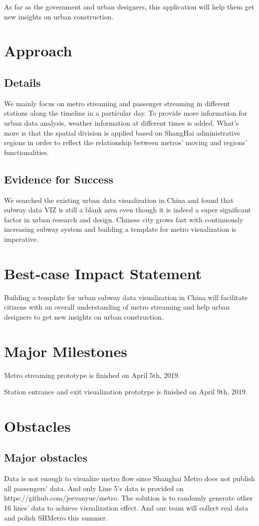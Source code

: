 \documentclass{proc}
\begin{document}
As far as the government and urban designers, this application will help them get new insights on urban construction.


\section{Approach}
\subsection{Details}
We mainly focus on metro streaming and passenger streaming in different stations along the timeline in a particular day. To provide more information for urban data analysis, weather information at different times is added. What’s more is that the spatial division is applied based on ShangHai administrative regions in order to reflect the relationship between metros’ moving and regions’ functionalities.
\subsection{Evidence for Success}
We searched the existing urban data visualization in China and found that subway data VIZ is still a blank area even though it is indeed a super significant factor in urban research and design. Chinese city grows fast with continuously increasing subway system and building a template for metro visualization is imperative.

\section{Best-case Impact Statement}
Building a template for urban subway data visualization in China will facilitate citizens with an overall understanding of metro streaming and help urban designers to get new insights on urban construction.
\section{Major Milestones}
Metro streaming prototype is finished on April 5th, 2019.

Station entrance and exit visualization prototype is finished on April 9th, 2019.
\section{Obstacles}

\subsection{Major obstacles} %
Data is not enough to visualize metro flow since Shanghai Metro does not publish all passengers’ data. And only Line 5’s data is provided on https://github.com/jeevanyue/metro. The solution is to randomly generate other 16 lines’ data to achieve visualization effect. And our team will collect real data and polish SHMetro this summer.
\end{document}
